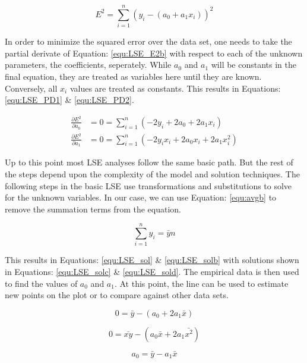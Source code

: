 \begin{equation}
\label{equ:LSE_E2b}
E^2 = \sum_{i=1}^{n} (y_i - (a_0 + a_1 x_i))^2
\end{equation}

In order to minimize the squared error over the data set, one needs to take the partial derivate of Equation: \eqref{equ:LSE_E2b} with respect to each of the unknown parameters, the coefficients, seperately. While $a_0$ and $a_1$ will be constants in the final equation, they are treated as variables here until they are known. Conversely, all $x_i$ values are treated as constants. This results in Equations: \eqref{equ:LSE_PD1} \& \eqref{equ:LSE_PD2}.

\begin{align} 
\frac{\partial E^2}{\partial a_0} &= 0 = \sum_{i=1}^{n} (-2y_i +2a_0 + 2a_1 x_i)           \label{equ:LSE_PD1} \\
\frac{\partial E^2}{\partial a_1} &= 0 = \sum_{i=1}^{n} (-2y_i x_i +2a_0 x_i + 2a_1 x_i^2) \label{equ:LSE_PD2}
\end{align}

Up to this point most LSE analyses follow the same basic path. But the rest of the steps depend upon the complexity of the model and solution techniques. The following steps in the basic LSE use transformations and substitutions to solve for the unknown variables. In our case, we can use Equation: \eqref{equ:avgb} to remove the summation terms from the equation.

\begin{equation}
\label{equ:avgb} 
\sum_{i=1}^{n} y_i  = \bar{y}n
\end{equation}

This results in Equations: \eqref{equ:LSE_sol} \& \eqref{equ:LSE_solb} with solutions shown in Equations: \eqref{equ:LSE_solc} \& \eqref{equ:LSE_sold}. The empirical data is then used to find the values of $a_0$ and $a_1$. At this point, the line can be used to estimate new points on the plot or to compare against other data sets.

\begin{equation}
\label{equ:LSE_sol}
0 = \bar{y} - (a_0 + 2a_1 \bar{x})
\end{equation}

\begin{equation}
\label{equ:LSE_solb}
0 = \bar{xy} - (a_0 \bar{x} + 2a_1 \bar{x^2})
\end{equation}

\begin{equation}
\label{equ:LSE_solc}
a_0 = \bar{y} - a_1 \bar{x}
\end{equation}

